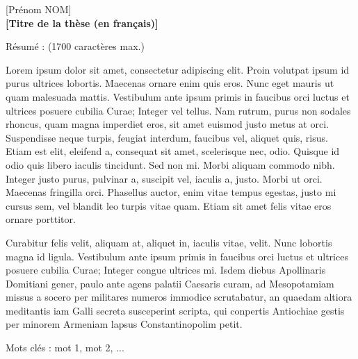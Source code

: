 {\parindent0pt %

\begin{center}
		\large{[Pr\'enom NOM]}\\ 
		\textbf{[Titre de la th\`ese (en français)]}
\end{center}

\begin{framed}
	\begin{minipage}{\dimexpr\textwidth-2\fboxrule-2\fboxsep}
	R\'esum\'e : (1700 caract\`eres max.)\par
	Lorem ipsum dolor sit amet, consectetur adipiscing elit. Proin volutpat ipsum id purus ultrices lobortis. Maecenas ornare enim quis eros. Nunc eget mauris ut quam malesuada mattis. Vestibulum ante ipsum primis in faucibus orci luctus et ultrices posuere cubilia Curae; Integer vel tellus. Nam rutrum, purus non sodales rhoncus, quam magna imperdiet eros, sit amet euismod justo metus at orci. Suspendisse neque turpis, feugiat interdum, faucibus vel, aliquet quis, risus. Etiam est elit, eleifend a, consequat sit amet, scelerisque nec, odio. Quisque id odio quis libero iaculis tincidunt. Sed non mi. Morbi aliquam commodo nibh. Integer justo purus, pulvinar a, suscipit vel, iaculis a, justo. Morbi ut orci. Maecenas fringilla orci. Phasellus auctor, enim vitae tempus egestas, justo mi cursus sem, vel blandit leo turpis vitae quam. Etiam sit amet felis vitae eros ornare porttitor.\par
	Curabitur felis velit, aliquam at, aliquet in, iaculis vitae, velit. Nunc lobortis magna id ligula. Vestibulum ante ipsum primis in faucibus orci luctus et ultrices posuere cubilia Curae; Integer congue ultrices mi.
	Isdem diebus Apollinaris Domitiani gener, paulo ante agens palatii Caesaris curam, ad Mesopotamiam missus a socero per militares numeros immodice scrutabatur, an quaedam altiora meditantis iam Galli secreta susceperint scripta, qui conpertis Antiochiae gestis per minorem Armeniam lapsus Constantinopolim petit.\par
Mots cl\'es : mot 1, mot 2, ...
	\end{minipage}
\end{framed}

}
